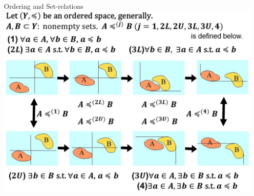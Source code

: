 \documentclass[aspectratio=169, dvipdfmx, 11pt]{beamer}
\begin{document}
\begin{frame}{Ordering and Set-relations}
  \centering
  \includegraphics[keepaspectratio, scale=0.28]{figures/eps/set-relations_3.eps}
\end{frame}
\end{document}
